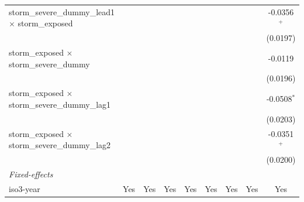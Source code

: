 \begin{tabular}{lcccccccc}
   storm\_severe\_dummy\_lead1 $\times$ storm\_exposed                &                       &                       &                       &                       &                       &                       &                       & -0.0356$^{+}$\\   
                                                                      &                       &                       &                       &                       &                       &                       &                       & (0.0197)\\   
   storm\_exposed $\times$ storm\_severe\_dummy                       &                       &                       &                       &                       &                       &                       &                       & -0.0119\\   
                                                                      &                       &                       &                       &                       &                       &                       &                       & (0.0196)\\   
   storm\_exposed $\times$ storm\_severe\_dummy\_lag1                 &                       &                       &                       &                       &                       &                       &                       & -0.0508$^{*}$\\   
                                                                      &                       &                       &                       &                       &                       &                       &                       & (0.0203)\\   
   storm\_exposed $\times$ storm\_severe\_dummy\_lag2                 &                       &                       &                       &                       &                       &                       &                       & -0.0351$^{+}$\\   
                                                                      &                       &                       &                       &                       &                       &                       &                       & (0.0200)\\   
   \midrule
   \emph{Fixed-effects}\\
   iso3-year                                                          & Yes                   & Yes                   & Yes                   & Yes                   & Yes                   & Yes                   & Yes                   & Yes\\  

\end{tabular}
